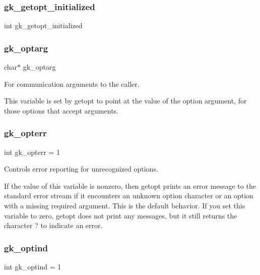 \subsubsection{\texorpdfstring{gk\+\_\+getopt\+\_\+initialized}{gk\_getopt\_initialized}}
{\footnotesize\ttfamily int gk\+\_\+getopt\+\_\+initialized}

\mbox{\label{a00038_a7e251e946564d7de41aa8f602b94e74e}} 
\subsubsection{\texorpdfstring{gk\+\_\+optarg}{gk\_optarg}}
{\footnotesize\ttfamily char$\ast$ gk\+\_\+optarg}



For communication arguments to the caller. 

This variable is set by getopt to point at the value of the option argument, for those options that accept arguments. \mbox{\label{a00038_abf798c082a4ebebbd9482c931c109541}} 
\subsubsection{\texorpdfstring{gk\+\_\+opterr}{gk\_opterr}}
{\footnotesize\ttfamily int gk\+\_\+opterr = 1}



Controls error reporting for unrecognized options. 

If the value of this variable is nonzero, then getopt prints an error message to the standard error stream if it encounters an unknown option character or an option with a missing required argument. This is the default behavior. If you set this variable to zero, getopt does not print any messages, but it still returns the character ? to indicate an error. \mbox{\label{a00038_ab70fc0e7e22192b687bd0d377bf61e32}} 
\subsubsection{\texorpdfstring{gk\+\_\+optind}{gk\_optind}}
{\footnotesize\ttfamily int gk\+\_\+optind = 1}



